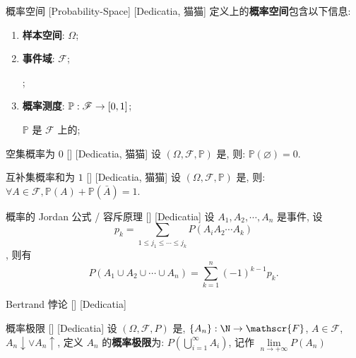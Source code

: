 \documentclass[UTF8]{ctexart}
\begin{document}
        \begin{str}
            {概率空间}
            [Probability-Space]
            [Dedicatia, 猫猫]
            定义上的\textbf{概率空间}包含以下信息: 
            \begin{enumerate}
                \item \textbf{样本空间}: \(\Omega\); 
                
                \item \textbf{事件域}: \(\mathscr{F}\); 
                    
                    ; 

                \item \textbf{概率测度}: \(\mathbb{P}: \mathscr{F}\to\Icc{0}{1}\); 
                
                    \(\mathbb{P}\) 是 \(\mathscr{F}\) 上的;
            \end{enumerate}
        \end{str}

        \begin{ppt}
            []
            {空集概率为 \(0\)}
            []
            [Dedicatia, 猫猫]
            设 \((\Omega,\mathscr{F},\mathbb{P})\) 是, 则: \(\mathbb{P}(\varnothing)=0\). 
        \end{ppt}

        \begin{ppt}
            []
            {互补集概率和为 \(1\)}
            []
            [Dedicatia, 猫猫]
            设 \((\Omega,\mathscr{F},\mathbb{P})\) 是, 则: \(\forall A\in\mathscr{F}, \mathbb{P}(A)+\mathbb{P}(\bar{A})=1\). 
        \end{ppt}

        \begin{thm}
            []
            {概率的 Jordan 公式 / 容斥原理}
            []
            [Dedicatia]
            设 \(A_1,A_2,\cdots,A_n\) 是事件, 设\[p_k=\sum_{1\leq j_1\leq\cdots\leq j_k  }P(A_i A_2\cdots A_k)\], 则有
            \[P(A_1\cup A_2\cup\cdots\cup A_n)=\sum_{k=1}^{n}(-1)^{k-1}p_k.\]
        \end{thm}

        \begin{cxmp}
            []
            {Bertrand 悖论}
            []
            [Dedicatia]
        \end{cxmp}

        \begin{dfn}
            []
            {概率极限}
            []
            [Dedicatia]
            设 \((\Omega,\mathscr{F},P)\) 是, \(\{A_n\}:\N\to\mathscr{F}\), \(A\in\mathscr{F}\), \(A_n\downarrow\lor A_n\uparrow\), 定义 \(A_n\) 的\textbf{概率极限}为: \(P\left(\bigcup\limits_{i=1}^{\infty}A_i\right)\), 记作 \(\lim\limits_{n\to+\infty}P(A_n)\)
        \end{dfn}
        
\end{document}
